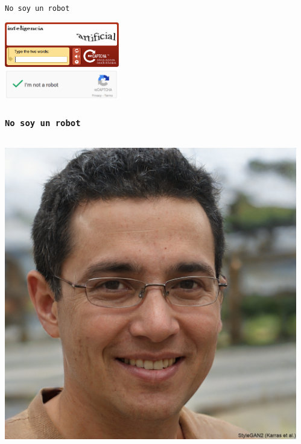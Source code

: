 \documentclass{beamer}
\begin{document}
\begin{frame}{\texttt{No soy un robot}}

\centering
\includegraphics[width=5cm]{fake-captcha.jpg} \\
\pause
\vspace{10mm}
\includegraphics[width=5cm]{re-captcha.png} \\

\end{frame}

\begin{frame}
    \frametitle{\texttt{No soy un robot}}

    \begin{columns}
        \begin{column}{0.4\textwidth}
            \centering
            \includegraphics[width=\textwidth]{thispersondoesnotexist.png}
            \text{\footnotesize \phantom{thispersondoesnotexist.com}}
            \text{\footnotesize \phantom{¡Esta persona no existe!}}
            \end{column}
        \begin{column}{0.6\textwidth}
        \end{column}
    \end{columns}
\end{frame}
\end{document}
